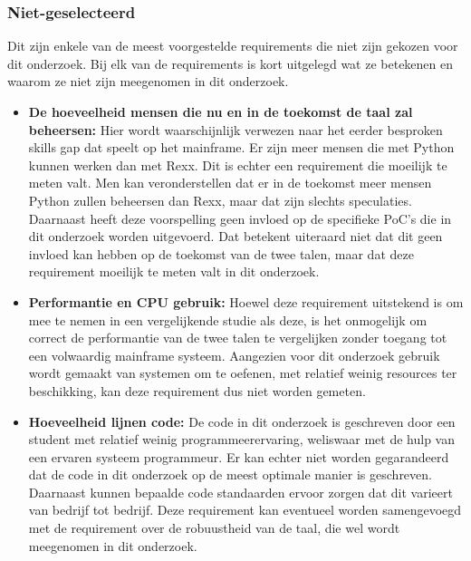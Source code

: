 \subsubsection{Niet-geselecteerd}
Dit zijn enkele van de meest voorgestelde requirements die niet zijn gekozen voor dit onderzoek. Bij elk van de requirements is kort uitgelegd wat ze betekenen en waarom ze niet zijn meegenomen in dit onderzoek.
\begin{itemize}
    \item \textbf{De hoeveelheid mensen die nu en in de toekomst de taal zal beheersen:} Hier wordt waarschijnlijk verwezen naar het eerder besproken skills gap dat speelt op het mainframe. Er zijn meer mensen die met Python kunnen werken dan met Rexx. Dit is echter een requirement die moeilijk te meten valt. Men kan veronderstellen dat er in de toekomst meer mensen Python zullen beheersen dan Rexx, maar dat zijn slechts speculaties. Daarnaast heeft deze voorspelling geen invloed op de specifieke PoC's die in dit onderzoek worden uitgevoerd. Dat betekent uiteraard niet dat dit geen invloed kan hebben op de toekomst van de twee talen, maar dat deze requirement moeilijk te meten valt in dit onderzoek.
    \item \textbf{Performantie en CPU gebruik:} Hoewel deze requirement uitstekend is om mee te nemen in een vergelijkende studie als deze, is het onmogelijk om correct de performantie van de twee talen te vergelijken zonder toegang tot een volwaardig mainframe systeem. Aangezien voor dit onderzoek gebruik wordt gemaakt van systemen om te oefenen, met relatief weinig resources ter beschikking, kan deze requirement dus niet worden gemeten.
    \item \textbf{Hoeveelheid lijnen code:} De code in dit onderzoek is geschreven door een student met relatief weinig programmeerervaring, weliswaar met de hulp van een ervaren systeem programmeur. Er kan echter niet worden gegarandeerd dat de code in dit onderzoek op de meest optimale manier is geschreven. Daarnaast kunnen bepaalde code standaarden ervoor zorgen dat dit varieert van bedrijf tot bedrijf. Deze requirement kan eventueel worden samengevoegd met de requirement over de robuustheid van de taal, die wel wordt meegenomen in dit onderzoek.
\end{itemize}    